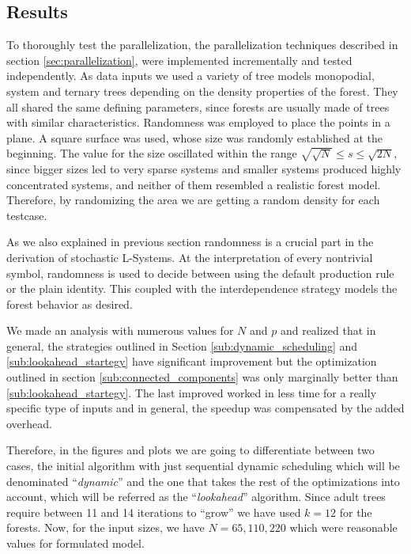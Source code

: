 \documentclass[letterpaper,twoside,11pt]{article}
\begin{document}
\begin{multicols}{2}


\section{Results} %
\label{sec:results}

To thoroughly test the parallelization, the parallelization techniques described in section \ref{sec:parallelization}, were implemented incrementally and tested independently. As data inputs we used a variety of tree models monopodial, system and ternary trees depending on the density properties of the forest. They all shared the same defining parameters, since forests are usually made of trees with similar characteristics. Randomness was employed to place the points in a plane. A square surface was used, whose size was randomly established at the beginning. The value for the size oscillated within the range $\sqrt{\sqrt{N}} \leq s \leq \sqrt{2N}$, since bigger sizes led to very sparse systems and smaller systems produced highly concentrated systems,  and neither of them resembled a realistic forest model. Therefore, by randomizing the area we are getting a random density for each testcase.

As we also explained in previous section randomness is a crucial part in the derivation of stochastic L-Systems. At the interpretation of every nontrivial symbol, randomness is used to decide between using the default production rule or the plain identity. This coupled with the interdependence strategy models the forest behavior as desired.

We made an analysis with numerous values for $N$ and $p$ and realized that in general, the strategies outlined in Section \ref{sub:dynamic_scheduling} and \ref{sub:lookahead_startegy} have significant improvement but the optimization outlined in section \ref{sub:connected_components} was only marginally better than \ref{sub:lookahead_startegy}. The last improved worked in less time for a really specific type of inputs and in general, the speedup was compensated by the added overhead.

Therefore, in the figures and plots we are going to differentiate between two cases, the initial algorithm with just sequential dynamic scheduling which will be denominated ``\emph{dynamic}'' and the one that takes the rest of the optimizations into account, which will be referred as the ``\emph{lookahead}'' algorithm. Since adult trees require between 11 and 14 iterations to ``grow'' we have used $k = 12$ for the forests. Now, for the input sizes, we have $N = 65, 110, 220$ which were reasonable values for formulated model.


\end{multicols}
\end{document}
